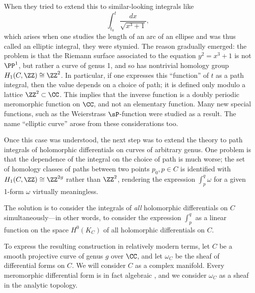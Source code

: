 When they tried to extend this to similar-looking integrals like
$$
\int_{t_0}^t \frac{dx}{\sqrt{x^3+1}},
$$
which arises when one studies the length of an arc of an ellipse and was thus called an elliptic integral, they were stymied. The reason gradually emerged: the problem is that the Riemann surface associated to the equation $y^2 = x^3+1$ is not $\PP^1$, but rather a curve of genus 1, and so has nontrivial homology group $H_1(C, \ZZ) \cong \ZZ^2$. In particular, if one expresses this ``function'' of $t$  as a path integral, then the value depends on a choice of path; it is defined only modulo a lattice $\ZZ^2 \subset \CC$. This implies that the inverse function is a doubly periodic meromorphic function on $\CC$, and not an elementary function. Many new special functions, such as the Weierstrass $\sP$-function were studied as a result. The name ``elliptic curve'' arose from these considerations too.

Once this case was understood, the next step was to extend the theory to path integrals of holomorphic differentials on curves of arbitrary genus. One problem is that the dependence of the integral on the choice of path is much worse; the set of homology classes of paths between two points $p_0, p \in C$ is identified with $H_1(C,\ZZ) \cong \ZZ^{2g}$ rather than $\ZZ^2$, rendering the expression $\int_p^q \omega$ for a given 1-form $\omega$ virtually meaningless.

The solution is to  consider the integrals of \emph{all} holomorphic differentials on $C$ simultaneously---in other words, to consider the expression $\int_p^q$ as a linear function on the space $H^0(K_C)$ of all holomorphic differentials on $C$.

To express the resulting construction in relatively modern terms, let $C$ be a smooth projective curve of genus $g$ over $\CC$, and let $\omega_{C}$ be the sheaf of differential forms on $C$. We will consider $C$ as a complex manifold. Every meromorphic differential form is in fact algebraic
\cite{SerreGAGA}, and we consider $\omega_{C}$ as a sheaf in the analytic topology.

